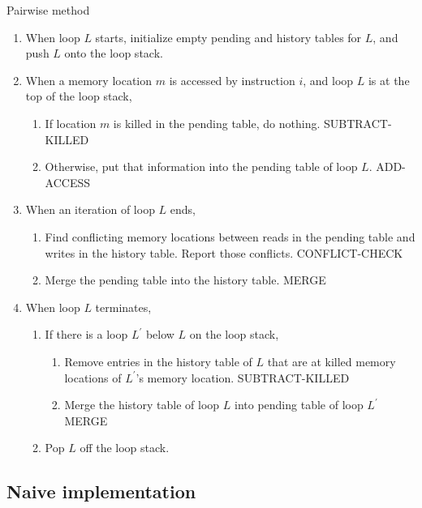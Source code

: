 \documentclass[12pt,twoside]{reedthesis}
\begin{document}
		\begin{algorithm}[H]
			\caption{Pairwise method}\label{basic-pariwise}
			\begin{enumerate}
				\item When loop $L$ starts, initialize empty pending and history tables for $L$, and push $L$ onto the loop stack.
				
				\item When a memory location $m$ is accessed by instruction $i$, and loop $L$ is at the top of the loop stack,
					\begin{enumerate}
						\item If location $m$ is killed in the pending table, do nothing. SUBTRACT-KILLED
						\item Otherwise, put that information into the pending table of loop $L$. ADD-ACCESS
					\end{enumerate} 
				
				\item When an iteration of loop $L$ ends,
					\begin{enumerate}
						\item Find conflicting memory locations between reads in the pending table and writes in the history table. Report those conflicts. CONFLICT-CHECK
						\item Merge the pending table into the history table. MERGE
					\end{enumerate} 
				
				\item When loop $L$ terminates, 
					\begin{enumerate}
						\item If there is a loop $L^\prime$ below $L$ on the loop stack,
						\begin{enumerate}
							\item Remove entries in the history table of $L$ that are at killed memory locations of $L^\prime$'s memory location. SUBTRACT-KILLED
							\item Merge the history table of loop $L$ into pending table of loop $L^\prime$ MERGE
						\end{enumerate} 
						\item Pop $L$ off the loop stack.
					\end{enumerate} 
				
			\end{enumerate}
		\end{algorithm}
	
	
		\subsection{Naive implementation}
		
\end{document}
